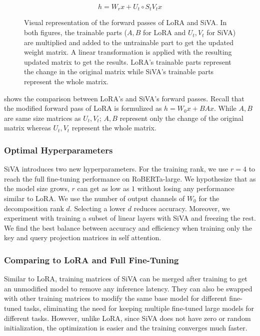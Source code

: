 \begin{equation}
    h = W_r x + U_t \circ S_t V_t x
\end{equation}

\begin{figure}[htb]
    \centering
    
    \caption{Visual representation of the forward passes of LoRA and SiVA. In both figures, the trainable parts (\(A, B\) for LoRA and \(U_t, V_t\) for SiVA) are multiplied and added to the untrainable part to get the updated weight matrix. A linear transformation is applied with the resulting updated matrix to get the results. LoRA's trainable parts represent the change in the original matrix while SiVA's trainable parts represent the whole matrix.}
    \label{lora-siva}
\end{figure}

 shows the comparison between LoRA's and SiVA's forward passes. Recall that the modified forward pass of LoRA is formulized as \(h = W_0 x + B A x\). While \(A, B\) are same size matrices as \(U_t, V_t\); \(A, B\) represent only the change of the original matrix whereas \(U_t, V_t\) represent the whole matrix. 

\subsubsection{Optimal Hyperparameters}
SiVA introduces two new hyperparameters. For the training rank, we use \(r=4\) to reach the full fine-tuning performance on RoBERTa-large. We hypothesize that as the model size grows, \(r\) can get as low as \(1\) without losing any performance similar to LoRA. We use the number of output channels of \(W_0\) for the decomposition rank \(d\). Selecting a lower \(d\) reduces accuracy. Moreover, we experiment with training a subset of linear layers with SiVA and freezing the rest. We find the best balance between accuracy and efficiency when training only the key and query projection matrices in self attention.

\subsubsection{Comparing to LoRA and Full Fine-Tuning}
Similar to LoRA, training matrices of SiVA can be merged after training to get an unmodified model to remove any inference latency. They can also be swapped with other training matrices to modify the same base model for different fine-tuned tasks, eliminating the need for keeping multiple fine-tuned large models for different tasks. However, unlike LoRA, since SiVA does not have zero or random initialization, the optimization is easier and the training converges much faster.

